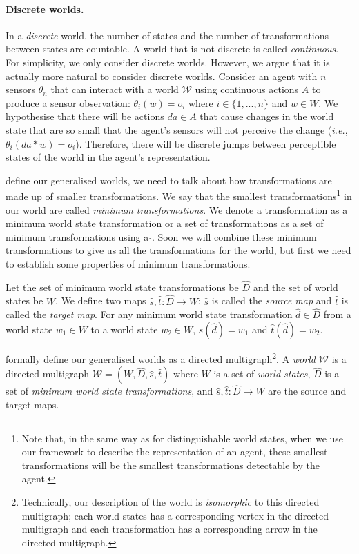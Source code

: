 \paragraph{Discrete worlds.}
In a \emph{discrete} world, the number of states and the number of transformations between states are countable.
A world that is not discrete is called \emph{continuous}.
For simplicity, we only consider discrete worlds.
However, we argue that it is actually more natural to consider discrete worlds.
Consider an agent with $n$ sensors $\theta_{n}$ that can interact with a world $\mathscr{W}$ using continuous actions $A$ to produce a sensor observation: $\theta_{i}(w) = o_{i}$ where $i \in \{1, ..., n\}$ and $w \in W$.
We hypothesise that there will be actions $da \in A$ that cause changes in the world state that are so small that the agent's sensors will not perceive the change (\textit{i.e.}, $\theta_{i}(da \ast w) = o_i$).
Therefore, there will be discrete jumps between perceptible states of the world in the agent's representation.

 define our generalised worlds, we need to talk about how transformations are made up of smaller transformations.
We say that the smallest transformations\footnote{Note that, in the same way as for distinguishable world states, when we use our framework to describe the representation of an agent, these smallest transformations will be the smallest transformations detectable by the agent.} in our world are called \emph{minimum transformations}.
We denote a transformation as a minimum world state transformation or a set of transformations as a set of minimum transformations using a $\hat{ }$.
Soon we will combine these minimum transformations to give us all the transformations for the world, but first we need to establish some properties of minimum transformations.

Let the set of minimum world state transformations be $\hat{D}$ and the set of world states be $W$.
We define two maps $\hat{s},\hat{t}: \hat{D} \to W$; $\hat{s}$ is called the \emph{source map} and $\hat{t}$ is called the \emph{target map}.
For any minimum world state transformation $\hat{d} \in \hat{D}$ from a world state $w_{1} \in W$ to a world state $w_{2} \in W$, $\hat{s}(\hat{d}) = w_{1}$ and $\hat{t}(\hat{d}) = w_{2}$.

 formally define our generalised worlds as a directed multigraph\footnote{Technically, our description of the world is \textit{isomorphic} to this directed multigraph; each world states has a corresponding vertex in the directed multigraph and each transformation has a corresponding arrow in the directed multigraph.}.
A \emph{world} $\mathscr{W}$ is a directed multigraph $\mathscr{W} = (W, \hat{D}, \hat{s}, \hat{t})$ where $W$ is a set of \emph{world states}, $\hat{D}$ is a set of \emph{minimum world state transformations}, and $\hat{s},\hat{t}: \hat{D} \to W$ are the source and target maps.

